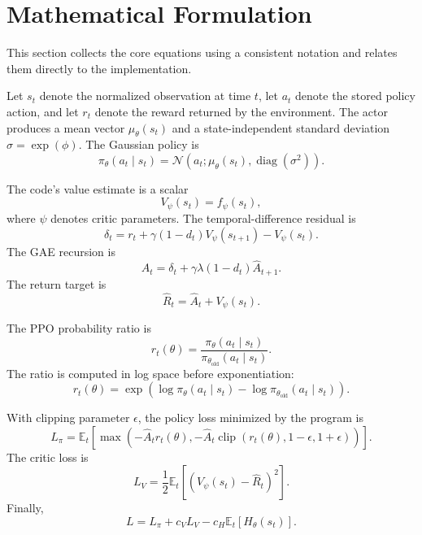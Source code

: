 \documentclass[11pt,a4paper]{article}
\begin{document}
\section{Mathematical Formulation}
This section collects the core equations using a consistent notation and relates them directly to the implementation.

Let $s_t$ denote the normalized observation at time $t$, let $a_t$ denote the stored policy action, and let $r_t$ denote the reward returned by the environment. The actor produces a mean vector $\mu_\theta(s_t)$ and a state-independent standard deviation $\sigma=\exp(\phi)$. The Gaussian policy is
\begin{equation}
\pi_\theta(a_t\mid s_t)
= \mathcal{N}\left(a_t;\mu_\theta(s_t),\operatorname{diag}(\sigma^2)\right).
\end{equation}

The code's value estimate is a scalar
\begin{equation}
V_\psi(s_t)=f_\psi(s_t),
\end{equation}
where $\psi$ denotes critic parameters. The temporal-difference residual is
\begin{equation}
\delta_t=r_t+\gamma(1-d_t)V_\psi(s_{t+1})-V_\psi(s_t).
\end{equation}
The GAE recursion is
\begin{equation}
\widehat{A}_t=\delta_t+\gamma\lambda(1-d_t)\widehat{A}_{t+1}.
\end{equation}
The return target is
\begin{equation}
\widehat{R}_t=\widehat{A}_t+V_\psi(s_t).
\end{equation}

The PPO probability ratio is
\begin{equation}
r_t(\theta)=\frac{\pi_\theta(a_t\mid s_t)}{\pi_{\theta_{\mathrm{old}}}(a_t\mid s_t)}.
\end{equation}
The ratio is computed in log space before exponentiation:
\begin{equation}
r_t(\theta)
=\exp\left(\log\pi_\theta(a_t\mid s_t)-\log\pi_{\theta_{\mathrm{old}}}(a_t\mid s_t)\right).
\end{equation}

With clipping parameter $\epsilon$, the policy loss minimized by the program is
\begin{equation}
L_\pi
= \mathbb{E}_t\left[
\max\left(
-\widehat{A}_t r_t(\theta),
-\widehat{A}_t\operatorname{clip}(r_t(\theta),1-\epsilon,1+\epsilon)
\right)
\right].
\end{equation}
The critic loss is
\begin{equation}
L_V = \frac{1}{2}\mathbb{E}_t\left[(V_\psi(s_t)-\widehat{R}_t)^2\right].
\end{equation}
Finally,
\begin{equation}
L = L_\pi + c_VL_V-c_H\mathbb{E}_t[H_\theta(s_t)].
\end{equation}
\end{document}
